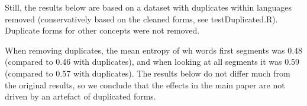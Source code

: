 \documentclass[10pt,a4paper,landscape]{article}
\begin{document}
Still, the results below are based on a dataset with duplicates within languages removed (conservatively based on the cleaned forms, see testDuplicated.R).  Duplicate forms for other concepts were not removed.  

When removing duplicates, the mean entropy of wh words first segments was 0.48 (compared to 0.46 with duplicates), and when looking at all segments it was 0.59 (compared to 0.57 with duplicates).  The results below do not differ much from the original results, so we conclude that the effects in the main paper are not driven by an artefact of duplicated forms. 








\end{document}
